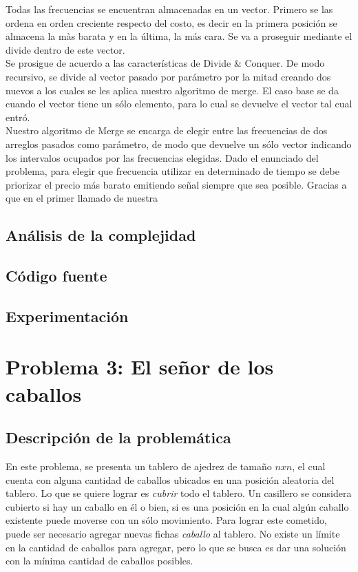 \documentclass[a4paper]{article}
\begin{document}
Todas las frecuencias se encuentran almacenadas en un vector. Primero se las ordena en orden creciente respecto del costo, es decir en la primera posición se almacena la màs barata y en la última, la más cara. Se va a proseguir mediante el divide dentro de este vector.\\

Se prosigue de acuerdo a las características de Divide \& Conquer. De modo recursivo, se divide al vector pasado por parámetro por la mitad creando dos nuevos a los cuales se les aplica nuestro algoritmo de merge. El caso base se da cuando el vector tiene un sólo elemento, para lo cual se devuelve el vector tal cual entró.\\

Nuestro algoritmo de Merge se encarga de elegir entre las frecuencias de dos arreglos pasados como parámetro, de modo que devuelve un sólo vector indicando los intervalos ocupados por las frecuencias elegidas. Dado el enunciado del problema, para elegir que frecuencia utilizar en determinado de tiempo se debe priorizar el precio más barato emitiendo señal siempre que sea posible. Gracias a que en el primer llamado de nuestra  

\subsection{An\'alisis de la complejidad}
\subsection{C\'odigo fuente}
\subsection{Experimentaci\'on}



\newpage

\section{Problema 3: El se\~nor de los caballos}
\subsection{Descripci\'on de la problem\'atica}

En este problema, se presenta un tablero de ajedrez de tama\~no $nxn$, el cual cuenta con alguna cantidad de caballos ubicados en una posici\'on aleatoria del tablero. Lo que se quiere lograr es \emph{cubrir} todo el tablero. Un casillero se considera cubierto si hay un caballo en \'el o bien, si es una posici\'on en la cual alg\'un caballo existente puede moverse con un s\'olo movimiento. Para lograr este cometido, puede ser necesario agregar nuevas fichas \emph{caballo} al tablero. No existe un l\'imite en la cantidad de caballos para agregar, pero lo que se busca es dar una soluci\'on con la m\'inima cantidad de caballos posibles.\\
\end{document}
